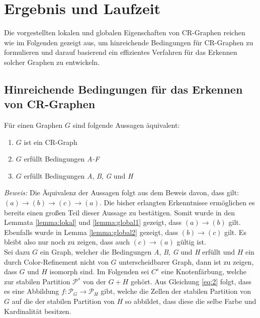 \section{Ergebnis und Laufzeit}
\label{sec/ergebnis}


Die vorgestellten lokalen und globalen Eigenschaften von CR-Graphen reichen wie im Folgenden gezeigt aus, um hinreichende Bedingungen für CR-Graphen zu formulieren und darauf basierend ein effizientes Verfahren für das Erkennen solcher Graphen zu entwickeln.

\subsection{Hinreichende Bedingungen für das Erkennen von CR-Graphen}
\begin{Theorem}
	Für einen Graphen $G$ sind folgende Aussagen äquivalent:
	
	\begin{enumerate}[label=(\alph*)]
		\item $G$ ist ein CR-Graph
		\item $G$ erfüllt Bedingungen \emph{A-F}
		\item $G$ erfüllt Bedingungen \emph{A}, \emph{B}, \emph{G} und \emph{H}
	\end{enumerate}
\end{Theorem}

\emph{Beweis:} Die Äquivalenz der Aussagen folgt aus dem Beweis davon, dass gilt: $(a)\rightarrow (b)\rightarrow (c)\rightarrow (a)$.
Die bisher erlangten Erkenntnisse ermöglichen es bereits einen großen Teil dieser Aussage zu bestätigen. Somit wurde in den Lemmata \ref{lemma:lokal} und \ref{lemma:global1} gezeigt, dass $(a)\rightarrow (b)$ gilt. Ebenfalls wurde in Lemma \ref{lemma:global2} gezeigt, dass $(b)\rightarrow (c)$ gilt. Es bleibt also nur noch zu zeigen, dass auch $(c)\rightarrow (a)$ gültig ist.\\

Sei dazu $G$ ein Graph, welcher die Bedingungen \emph{A}, \emph{B}, \emph{G} und \emph{H} erfüllt und $H$ ein durch Color-Refinement nicht von $G$ unterscheidbarer Graph, dann ist zu zeigen, dass $G$ und $H$ isomorph sind.
Im Folgenden sei $C^s$ eine Knotenfärbung, welche zur stabilen Partition $\mathcal{P}^s$ von der  $G+H$ gehört.
Aus Gleichung \ref{eq:2} folgt, dass es eine Abbildung $f:\mathcal{P}_G\rightarrow \mathcal{P}_H$ gibt, welche die Zellen der stabilen Partition von $G$ auf die der stabilen Partition von $H$ so abbildet, dass diese die selbe Farbe und Kardinalität besitzen.

